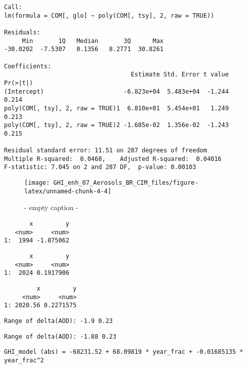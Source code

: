 \documentclass[
  10pt,
  a4paper,oneside]{article}
\begin{document}
\begin{verbatim}
Call:
lm(formula = COM[, glo] ~ poly(COM[, tsy], 2, raw = TRUE))

Residuals:
     Min       1Q   Median       3Q      Max 
-30.0202  -7.5307   0.1356   8.2771  30.8261 

Coefficients:
                                   Estimate Std. Error t value Pr(>|t|)
(Intercept)                      -6.823e+04  5.483e+04  -1.244    0.214
poly(COM[, tsy], 2, raw = TRUE)1  6.810e+01  5.454e+01   1.249    0.213
poly(COM[, tsy], 2, raw = TRUE)2 -1.685e-02  1.356e-02  -1.243    0.215

Residual standard error: 11.51 on 287 degrees of freedom
Multiple R-squared:  0.0468,    Adjusted R-squared:  0.04016 
F-statistic: 7.045 on 2 and 287 DF,  p-value: 0.00103
\end{verbatim}

\begin{figure}[H]

{\centering \texttt{[image: GHI\_enh\_07\_Aerosols\_BR\_CIM\_files/figure-latex/unnamed-chunk-4-4]} 

}

\caption{ - empty caption - }\label{fig:unnamed-chunk-4-4}
\end{figure}

\begin{verbatim}
       x         y
   <num>     <num>
1:  1994 -1.875062
\end{verbatim}

\begin{verbatim}
       x         y
   <num>     <num>
1:  2024 0.1917906
\end{verbatim}

\begin{verbatim}
         x         y
     <num>     <num>
1: 2020.56 0.2271575
\end{verbatim}

\begin{verbatim}
Range of delta(AOD): -1.9 0.23 
\end{verbatim}

\begin{verbatim}
Range of delta(AOD): -1.88 0.23 
\end{verbatim}

\begin{verbatim}
GHI_model (abs) = -68231.52 + 68.09819 * year_frac + -0.01685135 * year_frac^2 
\end{verbatim}
\end{document}
